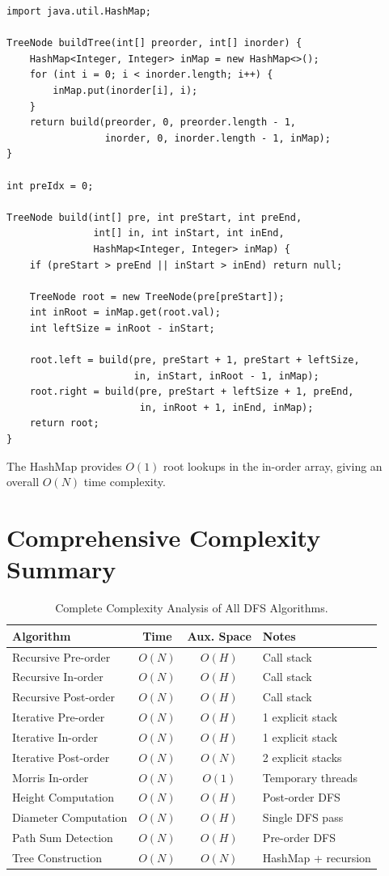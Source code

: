 \documentclass[10pt,journal,compsoc,onecolumn]{IEEEtran}
\begin{document}
\begin{verbatim}
import java.util.HashMap;

TreeNode buildTree(int[] preorder, int[] inorder) {
    HashMap<Integer, Integer> inMap = new HashMap<>();
    for (int i = 0; i < inorder.length; i++) {
        inMap.put(inorder[i], i);
    }
    return build(preorder, 0, preorder.length - 1,
                 inorder, 0, inorder.length - 1, inMap);
}

int preIdx = 0;

TreeNode build(int[] pre, int preStart, int preEnd,
               int[] in, int inStart, int inEnd,
               HashMap<Integer, Integer> inMap) {
    if (preStart > preEnd || inStart > inEnd) return null;

    TreeNode root = new TreeNode(pre[preStart]);
    int inRoot = inMap.get(root.val);
    int leftSize = inRoot - inStart;

    root.left = build(pre, preStart + 1, preStart + leftSize,
                      in, inStart, inRoot - 1, inMap);
    root.right = build(pre, preStart + leftSize + 1, preEnd,
                       in, inRoot + 1, inEnd, inMap);
    return root;
}
\end{verbatim}

The HashMap provides $O(1)$ root lookups in the in-order array, giving an overall $O(N)$ time complexity.

\section{Comprehensive Complexity Summary}

\begin{table}[htbp]
\centering
\caption{Complete Complexity Analysis of All DFS Algorithms.}
\label{tab:full_complexity}
\begin{tabular}{lccl}
\toprule
Algorithm & Time & Aux. Space & Notes \\
\midrule
Recursive Pre-order & $O(N)$ & $O(H)$ & Call stack \\
Recursive In-order & $O(N)$ & $O(H)$ & Call stack \\
Recursive Post-order & $O(N)$ & $O(H)$ & Call stack \\
Iterative Pre-order & $O(N)$ & $O(H)$ & 1 explicit stack \\
Iterative In-order & $O(N)$ & $O(H)$ & 1 explicit stack \\
Iterative Post-order & $O(N)$ & $O(N)$ & 2 explicit stacks \\
Morris In-order & $O(N)$ & $O(1)$ & Temporary threads \\
Height Computation & $O(N)$ & $O(H)$ & Post-order DFS \\
Diameter Computation & $O(N)$ & $O(H)$ & Single DFS pass \\
Path Sum Detection & $O(N)$ & $O(H)$ & Pre-order DFS \\
Tree Construction & $O(N)$ & $O(N)$ & HashMap + recursion \\
\bottomrule
\end{tabular}
\end{table}
\end{document}

